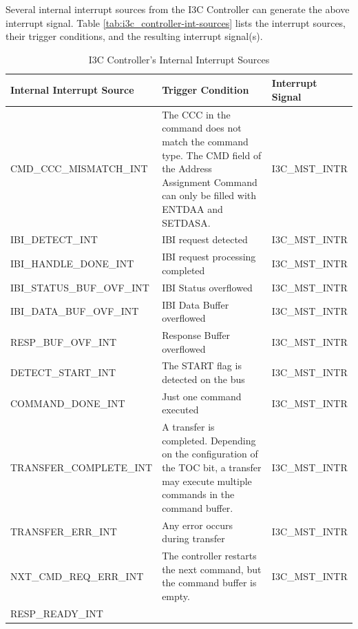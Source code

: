 \documentclass[main\_\_EN.tex]{subfiles}
\begin{document}
Several internal interrupt sources from the I3C Controller can generate the above interrupt signal. Table \ref{tab:i3c_controller-int-sources} lists the interrupt sources, their trigger conditions, and the resulting interrupt signal(s).

\begin{longtable}{ | L{4.5cm} | L{8.5cm} | L{2.5cm} | }
\caption{I3C Controller's Internal Interrupt Sources} \label{tab:i3c_controller-int-sources}
\\ \hline
{}
\textbf{Internal Interrupt Source} & \textbf{Trigger Condition}  &  \textbf{Interrupt Signal}\\ \hline
\label{int:CMDCCCMISMATCHINT}CMD\_CCC\_MISMATCH\_INT  &  The CCC in the command does not match the command type. The CMD field of the Address Assignment Command can only be filled with ENTDAA and SETDASA. &  I3C\_MST\_INTR  \\ \hline
\label{int:IBIDETECTINT}IBI\_DETECT\_INT &  IBI request detected & I3C\_MST\_INTR \\ \hline
\label{int:IBIHANDLEDONEINT}IBI\_HANDLE\_DONE\_INT &  IBI request processing completed  & I3C\_MST\_INTR \\ \hline
\label{int:IBISTATUSBUFOVFINT}IBI\_STATUS\_BUF\_OVF\_INT &  IBI Status overflowed & I3C\_MST\_INTR \\ \hline
\label{int:IBIDATABUFOVFINT}IBI\_DATA\_BUF\_OVF\_INT &  IBI Data Buffer overflowed  & I3C\_MST\_INTR \\ \hline
\label{int:RESPBUFOVFINT}RESP\_BUF\_OVF\_INT &  Response Buffer overflowed & I3C\_MST\_INTR \\ \hline
\label{int:DETECTSTARTINT}DETECT\_START\_INT &  The START flag is detected on the bus  & I3C\_MST\_INTR \\ \hline
\label{int:COMMANDDONEINT}COMMAND\_DONE\_INT &  Just one command executed  & I3C\_MST\_INTR \\ \hline
\label{int:TRANSFERCOMPLETEINT}TRANSFER\_COMPLETE\_INT &  A transfer is completed. Depending on the configuration of the TOC bit, a transfer may execute multiple commands in the command buffer.  & I3C\_MST\_INTR \\ \hline
\label{int:TRANSFERERRINT}TRANSFER\_ERR\_INT &  Any error occurs during transfer  & I3C\_MST\_INTR \\ \hline
\label{int:NXTCMDREQERRINT}NXT\_CMD\_REQ\_ERR\_INT &  The controller restarts the next command, but the command buffer is empty. & I3C\_MST\_INTR \\ \hline
\label{int:RESPREADYINT}RESP\_READY\_INT & \begin{itemize}

\end{itemize}
\end{longtable}
\end{document}
